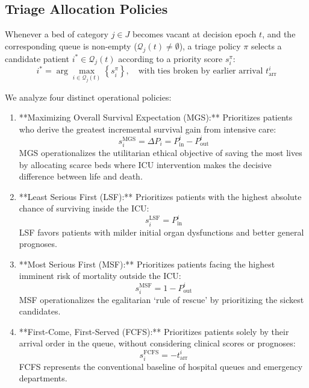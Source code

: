 \documentclass{ro}
\begin{document}
\subsection{Triage Allocation Policies}

Whenever a bed of category $j \in J$ becomes vacant at decision epoch $t$, and the corresponding queue is non-empty ($\mathcal{Q}_j(t) \ne \emptyset$), a triage policy $\pi$ selects a candidate patient $i^* \in \mathcal{Q}_j(t)$ according to a priority score $s_i^{\pi}$:
\begin{equation}
    i^* = \arg\max_{i \in \mathcal{Q}_j(t)} \left\{ s_i^{\pi} \right\}, \quad \text{with ties broken by earlier arrival } t_{\text{arr}}^i
\end{equation}

We analyze four distinct operational policies:
\begin{enumerate}
    \item **Maximizing Overall Survival Expectation (MGS):**
    Prioritizes patients who derive the greatest incremental survival gain from intensive care:
    \begin{equation}
        s_i^{\text{MGS}} = \Delta P_i = P_{\text{in}}^i - P_{\text{out}}^i
        \label{eq:mgs}
    \end{equation}
    MGS operationalizes the utilitarian ethical objective of saving the most lives by allocating scarce beds where ICU intervention makes the decisive difference between life and death.
    
    \item **Least Serious First (LSF):**
    Prioritizes patients with the highest absolute chance of surviving inside the ICU:
    \begin{equation}
        s_i^{\text{LSF}} = P_{\text{in}}^i
        \label{eq:lsf}
    \end{equation}
    LSF favors patients with milder initial organ dysfunctions and better general prognoses.
    
    \item **Most Serious First (MSF):**
    Prioritizes patients facing the highest imminent risk of mortality outside the ICU:
    \begin{equation}
        s_i^{\text{MSF}} = 1 - P_{\text{out}}^i
        \label{eq:msf}
    \end{equation}
    MSF operationalizes the egalitarian `rule of rescue' by prioritizing the sickest candidates.
    
    \item **First-Come, First-Served (FCFS):**
    Prioritizes patients solely by their arrival order in the queue, without considering clinical scores or prognoses:
    \begin{equation}
        s_i^{\text{FCFS}} = - t_{\text{arr}}^i
        \label{eq:fcfs}
    \end{equation}
    FCFS represents the conventional baseline of hospital queues and emergency departments.
\end{enumerate}
\end{document}

